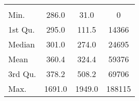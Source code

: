 \begin{tabular}{lS[table-format=5.1]S[table-format=5.1]S[table-format=5.1]}
&  &  &  \\
 Min.    & 286.0 & 31.0 & 0 \\
 1st Qu. & 295.0 & 111.5 & 14366 \\
 Median  & 301.0 & 274.0 & 24695 \\
 Mean    & 360.4 & 324.4 & 59376 \\
 3rd Qu. & 378.2 & 508.2 & 69706 \\
 Max.    & 1691.0 & 1949.0 & 188115 \\
\end{tabular}
